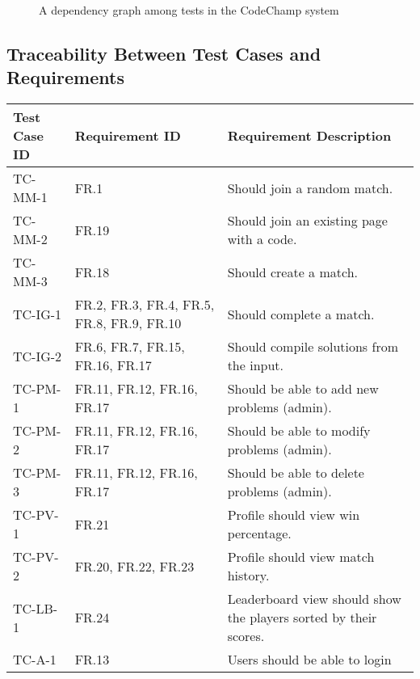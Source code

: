 \documentclass[12pt, titlepage]{article}
\begin{document}
\begin{figure}[H]
    \centering
    
    \caption{A dependency graph among tests in the CodeChamp system}
    \label{fig:deps}
\end{figure}




\subsection{Traceability Between Test Cases and Requirements}


\begin{longtable}{| p{2.5cm} | p{3cm} | p{8cm}| }
    \hline
    Test Case ID & Requirement ID & Requirement Description\\
    \hline
    TC-MM-1 & FR.1 & Should join a random match.\\
    \hline
    TC-MM-2 & FR.19 & Should join an existing page with a code. \\
     \hline
    TC-MM-3 & FR.18 & Should create a match. \\
     \hline
    TC-IG-1 & FR.2, FR.3, FR.4, FR.5, FR.8, FR.9, FR.10 & Should complete a match. \\
     \hline
    TC-IG-2 & FR.6, FR.7, FR.15, FR.16, FR.17 & Should compile solutions from the input.\\
     \hline
    TC-PM-1 & FR.11, FR.12, FR.16, FR.17 & Should be able to add new problems (admin).\\
     \hline
    TC-PM-2 & FR.11, FR.12, FR.16, FR.17 & Should be able to modify problems (admin).\\
     \hline
    TC-PM-3 & FR.11, FR.12, FR.16, FR.17 & Should be able to delete problems (admin).\\
     \hline
    TC-PV-1 & FR.21 & Profile should view win percentage.\\
    \hline
    TC-PV-2 & FR.20, FR.22, FR.23  & Profile should view match history.\\
    \hline
    TC-LB-1 & FR.24 & Leaderboard view should show the players sorted by their scores.\\
    \hline
    TC-A-1 & FR.13 & Users should be able to login\\

\end{longtable}
\end{document}
